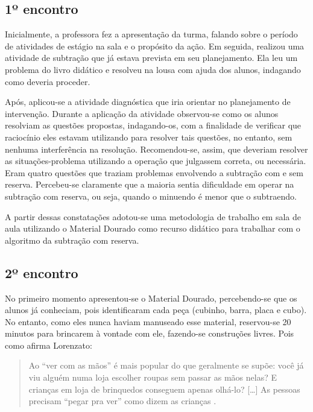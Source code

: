 \begin{refsection}
    \subsection{1º encontro}

    Inicialmente, a professora fez a apresentação da turma, falando sobre o período de atividades de estágio na sala e o propósito da ação. Em seguida, realizou uma atividade de subtração que já estava prevista em seu planejamento. Ela leu um problema do livro didático e resolveu na lousa com ajuda dos alunos, indagando como deveria proceder.  

    Após, aplicou-se a atividade diagnóstica que iria orientar no planejamento de intervenção. Durante a aplicação da atividade observou-se como os alunos resolviam as questões propostas, indagando-os, com a finalidade de verificar que raciocínio eles estavam utilizando para resolver tais questões, no entanto, sem nenhuma interferência na resolução. Recomendou-se, assim, que deveriam resolver as situações-problema utilizando a operação que julgassem correta, ou necessária. Eram quatro questões que traziam problemas envolvendo a subtração com e sem reserva. Percebeu-se claramente que a maioria sentia dificuldade em operar na subtração com reserva, ou seja, quando o minuendo é menor que o subtraendo.  

    A partir dessas constatações adotou-se uma metodologia de trabalho em sala de aula utilizando o Material Dourado como recurso didático para trabalhar com o algoritmo da subtração com reserva.

    \subsection{2º encontro}

    No primeiro momento apresentou-se o Material Dourado, percebendo-se que os alunos já conheciam, pois identificaram cada peça (cubinho, barra, placa e cubo). No entanto, como eles nunca haviam manuseado esse material, reservou-se 20 minutos para brincarem à vontade com ele, fazendo-se construções livres. Pois como afirma Lorenzato:  

    \begin{quotation}
        Ao “ver com as mãos” é mais popular do que geralmente se supõe: você já viu alguém numa loja escolher roupas sem passar as mãos nelas? E crianças em loja de brinquedos conseguem apenas olhá-lo? [\dots] As pessoas precisam “pegar pra ver” como dizem as crianças \cite[p.~18]{LORENZATO2006Começar}.
    \end{quotation}


\end{refsection}
